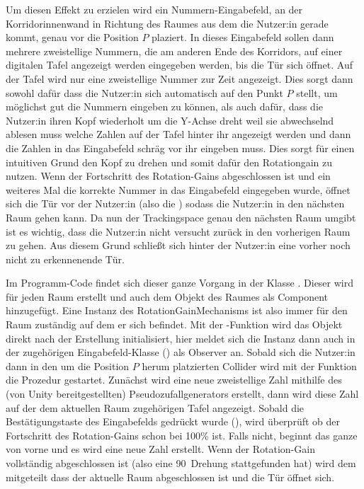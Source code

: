 Um diesen Effekt zu erzielen wird ein Nummern-Eingabefeld, an der Korridorinnenwand in Richtung des Raumes aus dem die Nutzer:in gerade kommt, genau vor die Position $P$ plaziert. In dieses Eingabefeld sollen dann mehrere zweistellige Nummern, die am anderen Ende des Korridors, auf einer digitalen Tafel angezeigt werden eingegeben werden, bis die Tür sich öffnet. Auf der Tafel wird nur eine zweistellige Nummer zur Zeit angezeigt.
Dies sorgt dann sowohl dafür dass die Nutzer:in sich automatisch auf den Punkt $P$ stellt, um möglichst gut die Nummern eingeben zu können, als auch dafür, dass die Nutzer:in ihren Kopf wiederholt um die Y-Achse dreht weil sie abwechselnd ablesen muss welche Zahlen auf der Tafel hinter ihr angezeigt werden und dann die Zahlen in das Eingabefeld schräg vor ihr eingeben muss. Dies sorgt für einen intuitiven Grund den Kopf zu drehen und somit dafür den Rotationgain zu nutzen. Wenn der Fortschritt des Rotation-Gains abgeschlossen ist und ein weiteres Mal die korrekte Nummer in das Eingabefeld eingegeben wurde, öffnet sich die Tür vor der Nutzer:in (also die ) sodass die Nutzer:in in den nächsten Raum gehen kann. Da nun der Trackingspace genau den nächsten Raum umgibt ist es wichtig, dass die Nutzer:in nicht versucht zurück in den vorherigen Raum zu gehen. Aus diesem Grund schließt sich hinter der Nutzer:in eine vorher noch nicht zu erkennenende Tür.

Im Programm-Code findet sich dieser ganze Vorgang in der Klasse . Dieser wird für jeden Raum erstellt und auch dem Objekt des Raumes als Component hinzugefügt. Eine Instanz des RotationGainMechanisms ist also immer für den Raum zuständig auf dem er sich befindet. Mit der -Funktion wird das Objekt direkt nach der Erstellung initialisiert, hier meldet sich die Instanz dann auch in der zugehörigen Eingabefeld-Klasse () als Observer an. Sobald sich die Nutzer:in dann in den um die Position $P$ herum platzierten Collider wird mit der Funktion  die Prozedur gestartet. Zunächst wird eine neue zweistellige Zahl mithilfe des (von Unity bereitgestellten) Pseudozufallgenerators erstellt, dann wird diese Zahl auf der dem aktuellen Raum zugehörigen Tafel angezeigt. Sobald die Bestätigungstaste des Eingabefelds gedrückt wurde (\textquote{$\#$}), wird überprüft ob der Fortschritt des Rotation-Gains schon bei 100\% ist. Falls nicht, beginnt das ganze von vorne und es wird eine neue Zahl erstellt. Wenn der Rotation-Gain vollständig abgeschlossen ist (also eine 90\textdegree\ Drehung stattgefunden hat) wird dem  mitgeteilt dass der aktuelle Raum abgeschlossen ist und die Tür öffnet sich.


